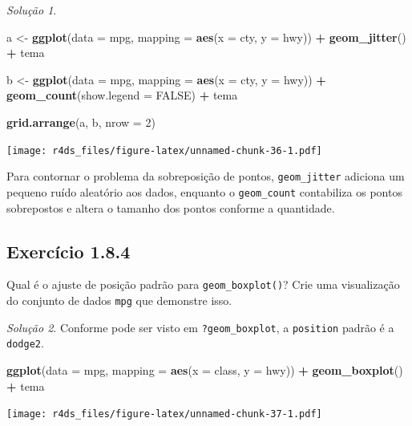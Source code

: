 \documentclass[
]{latex/krantz}
\newenvironment{Shaded}{\begin{snugshade}}{\end{snugshade}}
\newcommand{\AttributeTok}[1]{\textcolor[rgb]{0.13,0.29,0.53}{#1}}
\newcommand{\ConstantTok}[1]{\textcolor[rgb]{0.56,0.35,0.01}{#1}}
\newcommand{\DecValTok}[1]{\textcolor[rgb]{0.00,0.00,0.81}{#1}}
\newcommand{\FunctionTok}[1]{\textcolor[rgb]{0.13,0.29,0.53}{\textbf{#1}}}
\newcommand{\NormalTok}[1]{#1}
\newcommand{\OtherTok}[1]{\textcolor[rgb]{0.56,0.35,0.01}{#1}}
\newcommand{\SpecialCharTok}[1]{\textcolor[rgb]{0.81,0.36,0.00}{\textbf{#1}}}
\theoremstyle{definition}
\theoremstyle{definition}
\theoremstyle{definition}
\theoremstyle{definition}
\theoremstyle{remark}
\newtheorem*{solution}{Solução}
\begin{document}
\begin{solution}
\leavevmode

\begin{Shaded}
\begin{Highlighting}[]
\NormalTok{a }\OtherTok{\textless{}{-}} \FunctionTok{ggplot}\NormalTok{(}\AttributeTok{data =}\NormalTok{ mpg, }\AttributeTok{mapping =} \FunctionTok{aes}\NormalTok{(}\AttributeTok{x =}\NormalTok{ cty, }\AttributeTok{y =}\NormalTok{ hwy)) }\SpecialCharTok{+}
      \FunctionTok{geom\_jitter}\NormalTok{() }\SpecialCharTok{+}
\NormalTok{      tema}

\NormalTok{b }\OtherTok{\textless{}{-}} \FunctionTok{ggplot}\NormalTok{(}\AttributeTok{data =}\NormalTok{ mpg, }\AttributeTok{mapping =} \FunctionTok{aes}\NormalTok{(}\AttributeTok{x =}\NormalTok{ cty, }\AttributeTok{y =}\NormalTok{ hwy)) }\SpecialCharTok{+}
      \FunctionTok{geom\_count}\NormalTok{(}\AttributeTok{show.legend =} \ConstantTok{FALSE}\NormalTok{) }\SpecialCharTok{+}
\NormalTok{      tema}

\FunctionTok{grid.arrange}\NormalTok{(a, b, }\AttributeTok{nrow =} \DecValTok{2}\NormalTok{)}
\end{Highlighting}
\end{Shaded}

\texttt{[image: r4ds\_files/figure-latex/unnamed-chunk-36-1.pdf]}

Para contornar o problema da sobreposição de pontos, \texttt{geom\_jitter} adiciona um pequeno ruído aleatório aos dados, enquanto o \texttt{geom\_count} contabiliza os pontos sobrepostos e altera o tamanho dos pontos conforme a quantidade.

\end{solution}

\hypertarget{exr1-8-4}{%
\subsection*{Exercício 1.8.4}\label{exr1-8-4}}

Qual é o ajuste de posição padrão para \texttt{geom\_boxplot()}? Crie uma visualização do conjunto de dados \texttt{mpg} que demonstre isso.

\begin{solution}
Conforme pode ser visto em \texttt{?geom\_boxplot}, a \texttt{position} padrão é a \texttt{dodge2}.

\begin{Shaded}
\begin{Highlighting}[]
\FunctionTok{ggplot}\NormalTok{(}\AttributeTok{data =}\NormalTok{ mpg, }\AttributeTok{mapping =} \FunctionTok{aes}\NormalTok{(}\AttributeTok{x =}\NormalTok{ class, }\AttributeTok{y =}\NormalTok{ hwy)) }\SpecialCharTok{+}
    \FunctionTok{geom\_boxplot}\NormalTok{() }\SpecialCharTok{+}
\NormalTok{    tema}
\end{Highlighting}
\end{Shaded}

\texttt{[image: r4ds\_files/figure-latex/unnamed-chunk-37-1.pdf]}
\end{solution}
\end{document}
